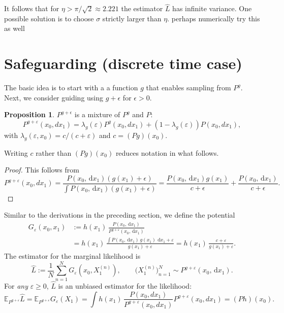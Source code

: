 \documentclass[11pt,reqno]{amsart}
\newcommand{\dd}{{\,\mathrm d}}
\newcommand{\eps}{\varepsilon}
\newcommand{\EE}{\mathbb{E}}
\theoremstyle{definition}
\newtheorem{prop}[thm]{Proposition}
\newcommand{\note}[1]{{\color{Sienna} #1}}
\begin{document}
It follows that for $\eta> \pi/\sqrt{2}\approx 2.221$ the estimator $\hat L$ has infinite variance. One possible solution is to choose $\sigma$ strictly larger than $\eta$. \note{perhaps numerically try this as well}







\section{Safeguarding (discrete time case)}

The basic idea is to start with a a function $g$ that enables sampling from $P^g$. Next, we consider guiding using $g+\epsilon$ for $\epsilon>0$.
\begin{prop}$P^{g+\epsilon}$ is a mixture of $P^g$ and $P$: 
\[ P^{g+\varepsilon}(x_0, d x_1)   = \lambda_g(\eps) P^g(x_0, d x_1) + (1-\lambda_g(\eps)) P(x_0, d x_1), \]
with $\lambda_g(\eps, x_0)= c/(c+\eps)$ and $c=(Pg)(x_0)$. 
\end{prop}
Writing $c$ rather than $(Pg)(x_0)$ reduces notation in what follows. 
\begin{proof} This follows from 
\[  P^{g+\varepsilon}(x_0, d x_1) =\frac{P(x_0, \dd x_1) (g(x_1)+\epsilon)}{\int P(x_0, \dd x_1) (g(x_1)+\epsilon)}= \frac{P(x_0, \dd x_1) g(x_1)}{c+\epsilon} + \frac{P(x_0, \dd x_1)}{c+\epsilon}. \]
\end{proof}


Similar to the derivations in the preceding section, we define the potential 
\begin{equation}\label{eq:G_eps}
\begin{split}
	G_\eps(x_0, x_1)
  & := h(x_1)\,\frac{P(x_0, \dd x_1)}{P^{g+\eps}(x_0, \dd x_1)}
  \\ & = h(x_1)\,\frac{\int P(x_0, \dd x_1)\, g(x_1)\, \dd x_1+ \eps}{g(x_1)  + \eps}
= h(x_1)\,\frac{c+ \eps}{g(x_1)+ \eps} .
\end{split}	\end{equation}
The estimator for the marginal likelihood is
\[
 \hat{L}:= \frac{1}{N}\sum_{n=1}^{N} G_\eps\!\left(x_0, X_1^{(n)}\right),
  \qquad \bigl(X_1^{(n)}\bigr)_{n=1}^{N} \sim P^{g+\eps}(x_0, \dd x_1).
\]
For {\it any} $\eps\ge 0$,  $\hat L$ is an unbiased estimator for the likelihood:
\[  \EE_{P^{g+\eps}} \hat{L}=\EE_{P^{g+\eps}} G_\eps(X_1) = \int  h(x_1)\,\frac{P(x_0, dx_1)}{P^{g+\eps}(x_0, dx_1)} P^{g+\eps}(x_0, dx_1) = (Ph)(x_0). \]
\end{document}
